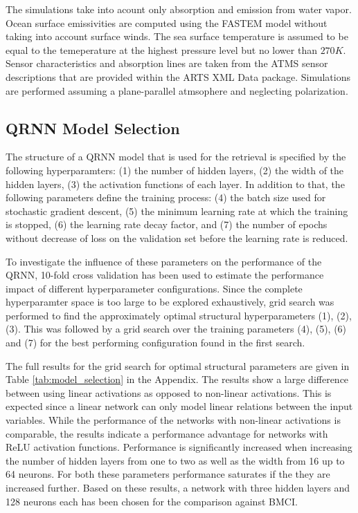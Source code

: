 \documentclass[journal abbreviation, manuscript]{copernicus}
\begin{document}
   The simulations take into acount only absorption and emission from water
   vapor. Ocean surface emissivities are computed using the FASTEM \cite{fastem}
   model without taking into account surface winds. The sea surface temperature
   is assumed to be equal to the temeperature at the highest pressure level but
   no lower than $270\unit{K}$. Sensor characteristics and absorption
   lines are taken from the ATMS sensor descriptions that are provided within
   the ARTS XML Data package. Simulations are performed assuming a
   plane-parallel atmsophere and neglecting polarization.

\subsection{QRNN Model Selection}

 The structure of a QRNN model that is used for the retrieval is specified by the
 following hyperparamters: (1) the number of hidden layers, (2) the width of
 the hidden layers, (3) the activation functions of each layer. In addition to
 that, the following parameters define the training process: (4) the batch size
 used for stochastic gradient descent, (5) the minimum learning rate at which
 the training is stopped, (6) the learning rate decay factor, and (7) the
 number of epochs without decrease of loss on the validation set before
 the learning rate is reduced.

  To investigate the influence of these parameters on the performance of the
  QRNN, 10-fold cross validation has been used to estimate the performance
  impact of different hyperparameter configurations. Since the complete
  hyperparamter space is too large to be explored exhaustively, grid search was
  performed to find the approximately optimal structural hyperparameters (1),
  (2), (3). This was followed by a grid search over the training parameters
  (4), (5), (6) and (7) for the best performing configuration found in the
  first search.

  The full results for the grid search for optimal structural parameters are
  given in Table \ref{tab:model_selection} in the Appendix. The results show a
  large difference between using linear activations as opposed to non-linear
  activations. This is expected since a linear network can only model linear
  relations between the input variables. While the performance of the networks
  with non-linear activations is comparable, the results indicate a performance
  advantage for networks with ReLU activation functions. Performance is
  significantly increased when increasing the number of hidden layers from one
  to two as well as the width from 16 up to 64 neurons. For both these
  parameters performance saturates if the they are increased further. Based on
  these results, a network with three hidden layers and 128 neurons each has
  been chosen for the comparison against BMCI.
\end{document}
